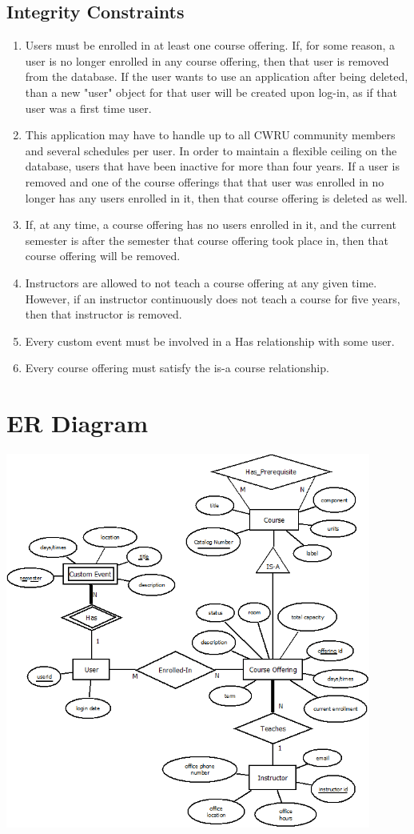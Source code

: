 \documentclass[pdftex,12pt,letter]{article}
\begin{document}
\subsection{Integrity Constraints}
\begin{enumerate}
\item Users must be enrolled in at least one course offering. If, for some reason, a user is no longer enrolled in any course offering, then that user is removed from the database. If the user wants to use an application after being deleted, than a new "user" object for that user will be created upon log-in, as if that user was a first time user.
\item This application may have to handle up to all CWRU community members and several schedules per user. In order to maintain a flexible ceiling on the database, users that have been inactive for more than four years. If a user is removed and one of the course offerings that that user was enrolled in no longer has any users enrolled in it, then that course offering is deleted as well.
\item If, at any time, a course offering has no users enrolled in it, and the current semester is after the semester that course offering took place in, then that course offering will be removed.
\item Instructors are allowed to not teach a course offering at any given time. However, if an instructor continuously does not teach a course for five years, then that instructor is removed.
\item Every custom event must be involved in a Has relationship with some user.
\item Every course offering must satisfy the is-a course relationship.
\end{enumerate}
\section{ER Diagram}
\includegraphics[width=120mm]{ERDiagram.png}
\FloatBarrier
\pagebreak
\end{document}
